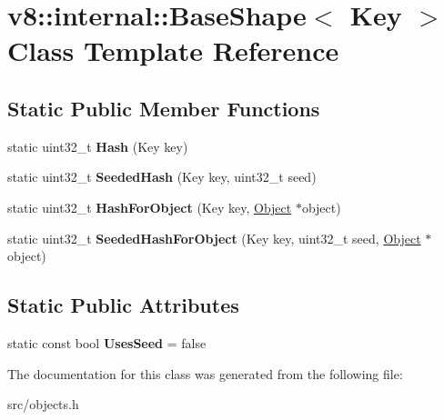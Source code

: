 \hypertarget{classv8_1_1internal_1_1_base_shape}{}\section{v8\+:\+:internal\+:\+:Base\+Shape$<$ Key $>$ Class Template Reference}
\label{classv8_1_1internal_1_1_base_shape}
\subsection*{Static Public Member Functions}
\begin{DoxyCompactItemize}
\item 
\hypertarget{classv8_1_1internal_1_1_base_shape_a8111960b11712048e3e15179ad2b9fda}{}static uint32\+\_\+t {\bfseries Hash} (Key key)\label{classv8_1_1internal_1_1_base_shape_a8111960b11712048e3e15179ad2b9fda}

\item 
\hypertarget{classv8_1_1internal_1_1_base_shape_a2d348acd6f23c45cc155cf7bcb788a15}{}static uint32\+\_\+t {\bfseries Seeded\+Hash} (Key key, uint32\+\_\+t seed)\label{classv8_1_1internal_1_1_base_shape_a2d348acd6f23c45cc155cf7bcb788a15}

\item 
\hypertarget{classv8_1_1internal_1_1_base_shape_ab025c536a6b030fab39f62934b25edce}{}static uint32\+\_\+t {\bfseries Hash\+For\+Object} (Key key, \hyperlink{classv8_1_1internal_1_1_object}{Object} $\ast$object)\label{classv8_1_1internal_1_1_base_shape_ab025c536a6b030fab39f62934b25edce}

\item 
\hypertarget{classv8_1_1internal_1_1_base_shape_ae3cd2d2f821c879f0deea40def681bd1}{}static uint32\+\_\+t {\bfseries Seeded\+Hash\+For\+Object} (Key key, uint32\+\_\+t seed, \hyperlink{classv8_1_1internal_1_1_object}{Object} $\ast$object)\label{classv8_1_1internal_1_1_base_shape_ae3cd2d2f821c879f0deea40def681bd1}

\end{DoxyCompactItemize}
\subsection*{Static Public Attributes}
\begin{DoxyCompactItemize}
\item 
\hypertarget{classv8_1_1internal_1_1_base_shape_a544eca693001174d4f4be9dec8b5b7aa}{}static const bool {\bfseries Uses\+Seed} = false\label{classv8_1_1internal_1_1_base_shape_a544eca693001174d4f4be9dec8b5b7aa}

\end{DoxyCompactItemize}


The documentation for this class was generated from the following file\+:\begin{DoxyCompactItemize}
\item 
src/objects.\+h\end{DoxyCompactItemize}
